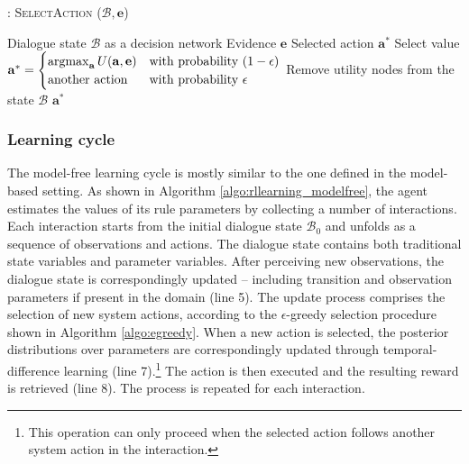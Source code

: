 \begin{algorithm}[h!]
\caption{: \textsc{SelectAction} ($\mathcal{B}, \mathbf{e}$)}
\begin{algorithmic}[1] \vspace{1mm}
\REQUIRE Dialogue state $\mathcal{B}$ as a decision network
\REQUIRE Evidence $\mathbf{e}$
\ENSURE Selected action $\mathbf{a}^*$
\STATE Select value $\mathbf{a}^* = \begin{cases} \argmax_{\mathbf{a}} U(\mathbf{a}, \mathbf{e}) & \text{with probability } (1- \epsilon) \\ \text{another action} & \text{with probability } \epsilon \end{cases}$
\STATE Remove utility nodes from the state $\mathcal{B}$
\RETURN $\mathbf{a}^*$
\end{algorithmic}
\label{algo:egreedy}
\end{algorithm}

\subsubsection*{Learning cycle}

The model-free learning cycle is mostly similar to the one defined in the model-based setting.  As shown in Algorithm \ref{algo:rllearning_modelfree}, the agent estimates the values of its rule parameters by collecting a number of interactions.  Each interaction starts from the initial dialogue state $\mathcal{B}_0$ and unfolds as a sequence of observations and actions.  The dialogue state contains both traditional state variables and parameter variables.  After perceiving new observations, the dialogue state is correspondingly updated -- including transition and observation parameters if present in the domain (line 5).  The update process comprises the selection of new system actions, according to the $\epsilon$-greedy selection procedure shown in Algorithm \ref{algo:egreedy}. When a new action is selected, the posterior distributions over parameters are correspondingly updated through temporal-difference learning (line 7).\footnote{This operation can only proceed when the selected action follows another system action in the interaction.} The action is then executed and the resulting reward is retrieved (line 8).  The process is repeated for each interaction. 


